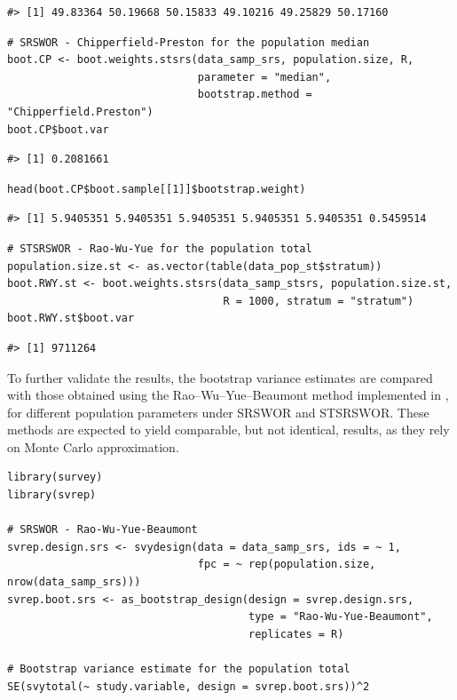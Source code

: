 \begin{verbatim}
#> [1] 49.83364 50.19668 50.15833 49.10216 49.25829 50.17160
\end{verbatim}

\begin{verbatim}
# SRSWOR - Chipperfield-Preston for the population median
boot.CP <- boot.weights.stsrs(data_samp_srs, population.size, R,
                              parameter = "median",
                              bootstrap.method = "Chipperfield.Preston")
boot.CP$boot.var
\end{verbatim}

\begin{verbatim}
#> [1] 0.2081661
\end{verbatim}

\begin{verbatim}
head(boot.CP$boot.sample[[1]]$bootstrap.weight)
\end{verbatim}

\begin{verbatim}
#> [1] 5.9405351 5.9405351 5.9405351 5.9405351 5.9405351 0.5459514
\end{verbatim}

\begin{verbatim}
# STSRSWOR - Rao-Wu-Yue for the population total
population.size.st <- as.vector(table(data_pop_st$stratum))
boot.RWY.st <- boot.weights.stsrs(data_samp_stsrs, population.size.st,
                                  R = 1000, stratum = "stratum")
boot.RWY.st$boot.var
\end{verbatim}

\begin{verbatim}
#> [1] 9711264
\end{verbatim}

To further validate the results, the bootstrap variance estimates are compared with those obtained using the Rao--Wu--Yue--Beaumont method implemented in , for different population parameters under SRSWOR and STSRSWOR. These methods are expected to yield comparable, but not identical, results, as they rely on Monte Carlo approximation.

\begin{verbatim}
library(survey)
library(svrep)

# SRSWOR - Rao-Wu-Yue-Beaumont
svrep.design.srs <- svydesign(data = data_samp_srs, ids = ~ 1,
                              fpc = ~ rep(population.size, nrow(data_samp_srs)))
svrep.boot.srs <- as_bootstrap_design(design = svrep.design.srs,
                                      type = "Rao-Wu-Yue-Beaumont",
                                      replicates = R)

# Bootstrap variance estimate for the population total
SE(svytotal(~ study.variable, design = svrep.boot.srs))^2
\end{verbatim}

